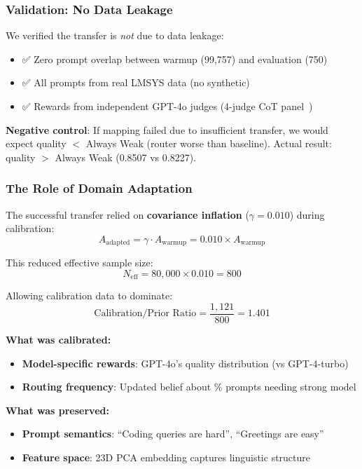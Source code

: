 \subsubsection{Validation: No Data Leakage}

We verified the transfer is \emph{not} due to data leakage:
\begin{itemize}
    \item ✅ Zero prompt overlap between warmup (99,757) and evaluation (750)
    \item ✅ All prompts from real LMSYS data (no synthetic)
    \item ✅ Rewards from independent GPT-4o judges (4-judge CoT panel~\cite{zheng2023judging})
\end{itemize}

\textbf{Negative control}: If mapping failed due to insufficient transfer, we would expect quality $<$ Always Weak (router worse than baseline). Actual result: quality $>$ Always Weak (0.8507 vs 0.8227).

\subsubsection{The Role of Domain Adaptation}

The successful transfer relied on \textbf{covariance inflation} ($\gamma = 0.010$) during calibration:
\begin{equation}
    A_{\text{adapted}} = \gamma \cdot A_{\text{warmup}} = 0.010 \times A_{\text{warmup}}
\end{equation}

This reduced effective sample size:
\begin{equation}
    N_{\text{eff}} = 80{,}000 \times 0.010 = 800
\end{equation}

Allowing calibration data to dominate:
\begin{equation}
    \text{Calibration/Prior Ratio} = \frac{1{,}121}{800} = 1.401
\end{equation}

\textbf{What was calibrated:}
\begin{itemize}
    \item \textbf{Model-specific rewards}: GPT-4o's quality distribution (vs GPT-4-turbo)
    \item \textbf{Routing frequency}: Updated belief about \% prompts needing strong model
\end{itemize}

\textbf{What was preserved:}
\begin{itemize}
    \item \textbf{Prompt semantics}: ``Coding queries are hard'', ``Greetings are easy''
    \item \textbf{Feature space}: 23D PCA embedding captures linguistic structure
\end{itemize}

